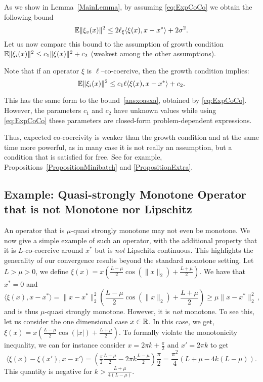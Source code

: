 \documentclass{article}
\begin{document}
\begin{remark}
As we show in Lemma~\eqref{MainLemma}, by assuming \ref{eq:ExpCoCo} we obtain the following bound \begin{equation}\label{ansxoasxa}
\mathbb{E} \| \xi_{v} (x)\|^2 \leq 2\ell_{\xi}\langle \xi (x),x-x^*\rangle  + 2 \sigma^2.
\end{equation} Let us now compare this bound to the assumption of growth condition $\mathbb{E}\|\xi_i(x)\|^2 \leq c_1 \|\xi(x)\|^2 +c_2$ (weakest among the other assumptions). 

Note that if an operator $\xi$ is $\ell$--co-coercive, then the growth condition implies:
$$\mathbb{E}\|\xi_i(x)\|^2 \leq c_1 \ell \langle \xi (x),x-x^*\rangle +c_2.$$

This has the same form to the bound~\eqref{ansxoasxa}, obtained by \ref{eq:ExpCoCo}. However, the parameters $c_1$ and $c_2$ have unknown values while using \ref{eq:ExpCoCo} these parameters are closed-form problem-dependent expressions. 

Thus, expected co-coercivity is weaker than the growth condition and at the same time more powerful, as in many case it is not really an assumption, but a condition that is satisfied for free. See for example, Propositions~\ref{PropositionMinibatch} and \ref{PropositionExtra}.
\end{remark}

\subsection{Example: Quasi-strongly Monotone Operator that is not Monotone nor Lipschitz}
\label{App:coolNonMonotoneExample}
An operator that is $\mu$-quasi strongly monotone may not even be monotone.  We now give a simple example of such an operator, with the additional property that it is $L$-co-coercive around $x^*$ but is \emph{not} Lipschitz continuous. This highlights the generality of our convergence results beyond the standard monotone setting. Let $L> \mu>0$, we define $\xi(x) = x (\frac{L-\mu}{2} \cos(\|x\|_2) + \frac{L+\mu}{2})$. We have that $x^*=0$ and 
\begin{equation}
  \langle \xi(x) , x-x^*\rangle = \|x-x^*\|^2_2 (\frac{L-\mu}{2} \cos(\|x\|_2) + \frac{L+\mu}{2}) \geq \mu \|x-x^*\|_2^2 \, ,
\end{equation}
and is thus $\mu$-quasi strongly monotone. However, it is \emph{not} monotone. To see this, let us consider the one dimensional case $x \in \mathbb{R}$. In this case, we get, $\xi(x) = x (\frac{L-\mu}{2} \cos(|x|) + \frac{L+\mu}{2})$. To formally violate the monotonicity inequality, we can for instance consider $x = 2 \pi k + \frac\pi2$ and $x'= 2 \pi k $ to get
\begin{equation}
 \langle \xi(x) - \xi(x') , x - x' \rangle  = (\tfrac\pi2\tfrac{L+\mu}{2} -  2 \pi k \tfrac{L-\mu}{2})\frac\pi2 =  \frac{\pi^2}4  (L+\mu -4k(L-\mu)) .
 \end{equation}
This quantity is negative for $k > \tfrac{L+\mu}{4(L-\mu)}$.
\end{document}
